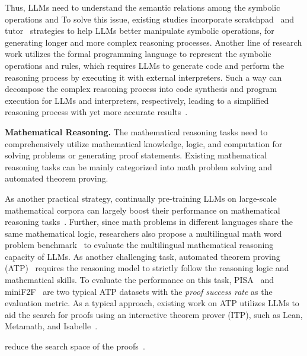 {{{{Thus, LLMs need to understand the semantic relations among the symbolic operations and To solve this issue, existing studies incorporate scratchpad~\cite{Anil-arxiv-2022-Exploring,Nye-arxiv-2021-Show} and tutor~\cite{Qian-arxiv-2022-Limitations} strategies to help LLMs better manipulate symbolic operations, for generating longer and more complex reasoning processes. Another line of research work utilizes the formal programming language to represent the symbolic operations and rules, which requires LLMs to generate code and perform the reasoning process by executing it with external interpreters. Such a way can decompose the complex reasoning process into code synthesis and program execution for LLMs and interpreters, respectively, leading to a simplified  reasoning process with yet more accurate results~\cite{Gao-arxiv-2022-PAL}.

\textbf{Mathematical Reasoning.} The mathematical reasoning tasks need to comprehensively utilize mathematical knowledge, logic, and computation for solving problems or generating proof statements. Existing mathematical reasoning tasks can be mainly categorized into math problem solving and automated theorem proving.  

As another practical strategy, continually pre-training LLMs on large-scale mathematical corpora can largely boost their performance on  {mathematical reasoning tasks~\cite{Zhao-KDD-2022-JiuZhang,Taylor-arxiv-2022-Galactica,Lewkowycz-arxiv-2022-Solving}.} Further, since math problems in different languages share the same mathematical logic, researchers also propose a multilingual math word problem benchmark~\cite{Shi-arxiv-2022-Language} to evaluate the multilingual mathematical reasoning capacity of LLMs. As another challenging task,  automated theorem proving (ATP)~\cite{Zheng-ICLR-2022-miniF2F,Welleck-NIPS-2021-NaturalProofs,Wang-CICM-2018-First} requires the reasoning model to strictly follow the reasoning logic and mathematical skills. {To evaluate the performance on this task, PISA~\cite{Jiang-AITP-2021-LISA} and miniF2F~\cite{Zheng-ICLR-2022-miniF2F} are two typical ATP datasets with the \emph{proof success rate} as the evaluation metric.} As a typical approach, existing work on ATP utilizes LLMs to aid the search for proofs using an interactive theorem prover (ITP), such as Lean, Metamath, and Isabelle~\cite{Polu-arxiv-2020-Generative,Jiang-arxiv-2022-Thor,Polu-arxiv-2022-Formal}.  

{reduce the search space of the proofs}~\cite{Jiang-arxiv-2022-Draft}.

}}}}
